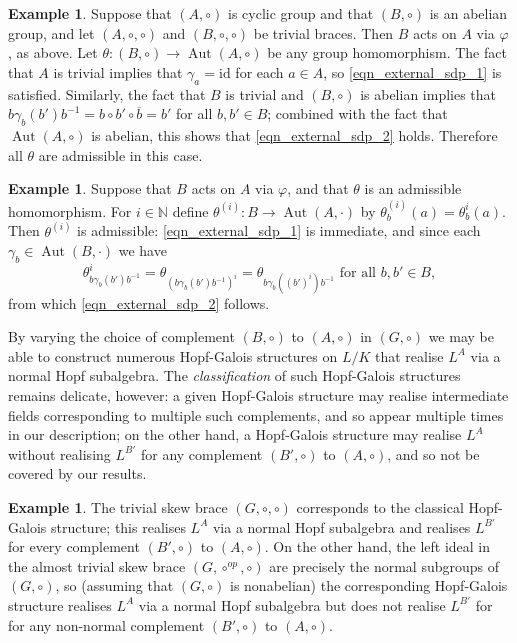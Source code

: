 \documentclass[12pt,a4paper, reqno]{amsart}
\theoremstyle{definition}
\newtheorem{example}[theorem]{Example}
\renewcommand{\bar}{\overline}
\DeclareMathOperator{\Aut}{\mbox{Aut}}
\begin{document}
\begin{example} \label{eg_cyclic_abelian_all_admissible}
Suppose that $ (A,\circ) $ is cyclic group and that $ (B,\circ) $ is an abelian group, and let $ (A,\circ,\circ) $ and $ (B,\circ,\circ) $ be trivial braces. Then $ B $ acts on $ A $ via $ \varphi $, as above. Let $ \theta : (B,\circ) \rightarrow \Aut(A,\circ) $ be any group homomorphism. The fact that $ A $ is trivial implies that $ \gamma_{a} = \mathrm{id} $ for each $ a \in A $, so \eqref{eqn_external_sdp_1} is satisfied. Similarly, the fact that $ B $ is trivial and $ (B,\circ) $ is abelian implies that $ b\gamma_{b}(b')b^{-1} = b \circ b' \circ \bar{b} = b' $ for all $ b,b' \in B $; combined with the fact that $ \Aut(A,\circ) $ is abelian, this shows that \eqref{eqn_external_sdp_2} holds. Therefore all $ \theta $ are admissible in this case. 
\end{example}

\begin{example} \label{eg_powers_of_admissible}
Suppose that $ B $ acts on $ A $ via $ \varphi $, and that $ \theta $ is an admissible homomorphism. For $ i \in \mathbb{N} $ define $ \theta^{(i)} : B \rightarrow \Aut(A,\cdot) $ by $ \theta^{(i)}_{b}(a) = \theta_{b}^{i}(a) $. Then $ \theta^{(i)} $ is admissible: \eqref{eqn_external_sdp_1} is immediate, and since each $ \gamma_{b} \in \Aut(B,\cdot) $ we have
\[ \theta_{b\gamma_{b}(b')b^{-1}}^{i} = \theta_{(b\gamma_{b}(b')b^{-1})^{i}} = \theta_{b\gamma_{b}((b')^{i})b^{-1}} \mbox{ for all } b,b' \in B, \] 
from which \eqref{eqn_external_sdp_2} follows.
\end{example}

By varying the choice of complement $ (B,\circ) $ to $ (A,\circ) $ in $ (G,\circ) $ we may be able to construct numerous Hopf-Galois structures on $ L/K $ that realise $ L^{A} $ via a normal Hopf subalgebra. The \textit{classification} of such Hopf-Galois structures remains delicate, however: a given Hopf-Galois structure may realise intermediate fields corresponding to multiple such complements, and so appear multiple times in our description; on the other hand, a Hopf-Galois structure may realise $ L^{A} $ without realising $ L^{B'} $ for any complement $ (B',\circ) $ to $ (A,\circ) $, and so not be covered by our results. 

\begin{example}
The trivial skew brace $ (G,\circ,\circ) $ corresponds to the classical Hopf-Galois structure; this realises $ L^{A} $ via a normal Hopf subalgebra and realises $ L^{B'} $ for every complement $ (B',\circ) $ to $ (A,\circ) $. On the other hand, the left ideal in the almost trivial skew brace $ (G,\circ^{op},\circ) $ are precisely the normal subgroups of $ (G,\circ) $, so (assuming that $ (G,\circ) $ is nonabelian) the corresponding Hopf-Galois structure realises $ L^{A} $ via a normal Hopf subalgebra but does not realise $ L^{B'} $ for for any non-normal complement $ (B',\circ) $ to $ (A,\circ) $.
\end{example}
\end{document}

